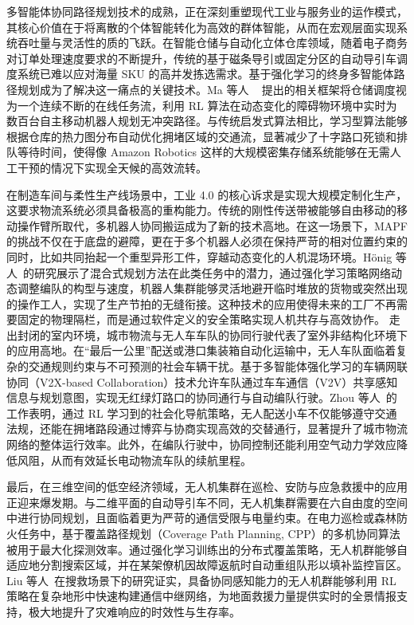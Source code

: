 \documentclass[13.5pt]{extarticle}
\begin{document}
多智能体协同路径规划技术的成熟，正在深刻重塑现代工业与服务业的运作模式，其核心价值在于将离散的个体智能转化为高效的群体智能，从而在宏观层面实现系统吞吐量与灵活性的质的飞跃。在智能仓储与自动化立体仓库领域，随着电子商务对订单处理速度要求的不断提升，传统的基于磁条导引或固定分区的自动导引车调度系统已难以应对海量 SKU 的高并发拣选需求。基于强化学习的终身多智能体路径规划成为了解决这一痛点的关键技术。Ma 等人 ~\cite{ma2017lifelong} 提出的相关框架将仓储调度视为一个连续不断的在线任务流，利用 RL 算法在动态变化的障碍物环境中实时为数百台自主移动机器人规划无冲突路径。与传统启发式算法相比，学习型算法能够根据仓库的热力图分布自动优化拥堵区域的交通流，显著减少了十字路口死锁和排队等待时间，使得像 Amazon Robotics 这样的大规模密集存储系统能够在无需人工干预的情况下实现全天候的高效流转。

在制造车间与柔性生产线场景中，工业 4.0 的核心诉求是实现大规模定制化生产，这要求物流系统必须具备极高的重构能力。传统的刚性传送带被能够自由移动的移动操作臂所取代，多机器人协同搬运成为了新的技术高地。在这一场景下，MAPF 的挑战不仅在于底盘的避障，更在于多个机器人必须在保持严苛的相对位置约束的同时，比如共同抬起一个重型异形工件，穿越动态变化的人机混场环境。Hönig 等人~\cite{honig2018conflict}的研究展示了混合式规划方法在此类任务中的潜力，通过强化学习策略网络动态调整编队的构型与速度，机器人集群能够灵活地避开临时堆放的货物或突然出现的操作工人，实现了生产节拍的无缝衔接。这种技术的应用使得未来的工厂不再需要固定的物理隔栏，而是通过软件定义的安全策略实现人机共存与高效协作。
走出封闭的室内环境，城市物流与无人车车队的协同行驶代表了室外非结构化环境下的应用高地。在“最后一公里”配送或港口集装箱自动化运输中，无人车队面临着复杂的交通规则约束与不可预测的社会车辆干扰。基于多智能体强化学习的车辆网联协同（V2X-based Collaboration）技术允许车队通过车车通信（V2V）共享感知信息与规划意图，实现无红绿灯路口的协同通行与自动编队行驶。Zhou 等人~\cite{zhou2020smarts}的工作表明，通过 RL 学习到的社会化导航策略，无人配送小车不仅能够遵守交通法规，还能在拥堵路段通过博弈与协商实现高效的交替通行，显著提升了城市物流网络的整体运行效率。此外，在编队行驶中，协同控制还能利用空气动力学效应降低风阻，从而有效延长电动物流车队的续航里程。

最后，在三维空间的低空经济领域，无人机集群在巡检、安防与应急救援中的应用正迎来爆发期。与二维平面的自动导引车不同，无人机集群需要在六自由度的空间中进行协同规划，且面临着更为严苛的通信受限与电量约束。在电力巡检或森林防火任务中，基于覆盖路径规划（Coverage Path Planning, CPP）的多机协同算法被用于最大化探测效率。通过强化学习训练出的分布式覆盖策略，无人机群能够自适应地分割搜索区域，并在某架僚机因故障返航时自动重组队形以填补监控盲区。Liu 等人~\cite{liu2019cooperative}在搜救场景下的研究证实，具备协同感知能力的无人机群能够利用 RL 策略在复杂地形中快速构建通信中继网络，为地面救援力量提供实时的全景情报支持，极大地提升了灾难响应的时效性与生存率。
\end{document}
